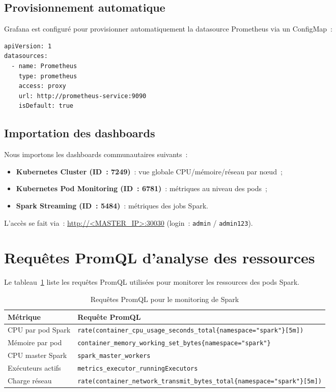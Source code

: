 \documentclass[12pt,a4paper,french]{report}
\begin{document}
\subsection{Provisionnement automatique}

Grafana est configuré pour provisionner automatiquement la datasource Prometheus via un ConfigMap~:

\begin{lstlisting}[style=yaml, caption={Datasource Prometheus provisionnée automatiquement}]
apiVersion: 1
datasources:
  - name: Prometheus
    type: prometheus
    access: proxy
    url: http://prometheus-service:9090
    isDefault: true
\end{lstlisting}

\subsection{Importation des dashboards}

Nous importons les dashboards communautaires suivants~:
\begin{itemize}
  \item \textbf{Kubernetes Cluster (ID~: 7249)}~: vue globale CPU/mémoire/réseau par nœud~;
  \item \textbf{Kubernetes Pod Monitoring (ID~: 6781)}~: métriques au niveau des pods~;
  \item \textbf{Spark Streaming (ID~: 5484)}~: métriques des jobs Spark.
\end{itemize}

L'accès se fait via~: \url{http://<MASTER_IP>:30030} (login~: \texttt{admin} / \texttt{admin123}).

\section{Requêtes PromQL d'analyse des ressources}

Le tableau~\ref{tab:promql} liste les requêtes PromQL utilisées pour monitorer les ressources des pods Spark.

\begin{table}[H]
\centering
\caption{Requêtes PromQL pour le monitoring de Spark}
\label{tab:promql}
\small
\begin{tabularx}{\textwidth}{lX}
\toprule
\textbf{Métrique} & \textbf{Requête PromQL} \\
\midrule
CPU par pod Spark & \texttt{rate(container\_cpu\_usage\_seconds\_total\{namespace="spark"\}[5m])} \\
\addlinespace
Mémoire par pod & \texttt{container\_memory\_working\_set\_bytes\{namespace="spark"\}} \\
\addlinespace
CPU master Spark & \texttt{spark\_master\_workers} \\
\addlinespace
Exécuteurs actifs & \texttt{metrics\_executor\_runningExecutors} \\
\addlinespace
Charge réseau & \texttt{rate(container\_network\_transmit\_bytes\_total\{namespace="spark"\}[5m])} \\
\bottomrule
\end{tabularx}
\end{table}
\end{document}
